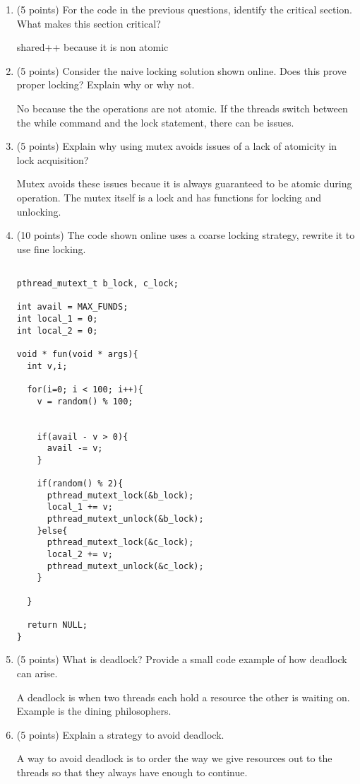 \documentclass{article}[9pt]
\newenvironment{answerfont}{\fontfamily{qhv}\selectfont}{\par}
\newenvironment{myanswer}{\begin{mdframed}\begin{answerfont}}{\end{answerfont}\end{mdframed}}
\begin{document}
\begin{enumerate}
\item (5 points) For the code in the previous questions, identify the critical section. What makes this section critical?
\begin{myanswer}
shared++ because it is non atomic
\end{myanswer}

\item (5 points) Consider the naive locking solution shown online. Does this prove proper locking? Explain why or why not.
\begin{myanswer}
No because the the operations are not atomic. If the threads switch between the while command and the lock statement, there can be issues.
\end{myanswer}

\item (5 points) Explain why using mutex avoids issues of a lack of atomicity in lock acquisition?
\begin{myanswer}
Mutex avoids these issues becaue it is always guaranteed to be atomic during operation. The mutex itself is a lock and has functions for locking and unlocking.
\end{myanswer}

\item (10 points) The code shown online uses a coarse locking strategy, rewrite it to use fine locking.
\begin{myanswer}
\begin{verbatim}

pthread_mutext_t b_lock, c_lock;

int avail = MAX_FUNDS;
int local_1 = 0;
int local_2 = 0;

void * fun(void * args){
  int v,i;

  for(i=0; i < 100; i++){
    v = random() % 100;


    if(avail - v > 0){
      avail -= v;
    }

    if(random() % 2){
      pthread_mutext_lock(&b_lock);
      local_1 += v;
      pthread_mutext_unlock(&b_lock);
    }else{
      pthread_mutext_lock(&c_lock);
      local_2 += v;
      pthread_mutext_unlock(&c_lock);
    }

  }

  return NULL;
}
\end{verbatim}
\end{myanswer}

\item (5 points) What is deadlock? Provide a small code example of how deadlock can arise.
\begin{myanswer}
A deadlock is when two threads each hold a resource the other is waiting on. Example is the dining philosophers.
\end{myanswer}

\item (5 points) Explain a strategy to avoid deadlock.
\begin{myanswer}
A way to avoid deadlock is to order the way we give resources out to the threads so that they always have enough to continue.
\end{myanswer}


\end{enumerate}
\end{document}
